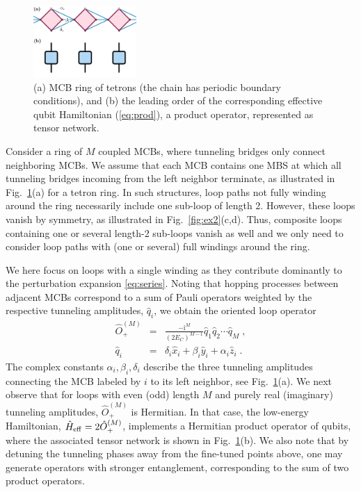 \documentclass[twocolumn,floats,prx,showpacs]{revtex4-1}
\begin{document}
\begin{figure}
\includegraphics[width=0.35\textwidth]{fig/tetron_prod.pdf}
\caption{(a) MCB ring of tetrons (the chain has periodic boundary conditions), and (b) the leading order of the corresponding effective qubit Hamiltonian (\ref{eq:prod}), a product operator, represented as tensor network.}
\label{fig:tetron_prod}
\end{figure}

Consider a ring of $M$ coupled MCBs, where tunneling bridges only connect neighboring MCBs.  We assume that each MCB contains one MBS at which all tunneling bridges incoming from the left neighbor terminate, as illustrated in Fig.~\ref{fig:tetron_prod}(a) for a tetron ring. In such structures,  loop paths not fully winding around the ring necessarily include one sub-loop of length 2. However, these loops vanish by symmetry, as illustrated in Fig.~\ref{fig:ex2}(c,d). Thus, composite loops containing one or several length-2 sub-loops vanish as well and we only need to consider loop paths with (one or several) full windings around the ring.

We here focus on loops with a single winding as they contribute dominantly to the perturbation expansion \eqref{eq:series}. Noting that hopping processes between adjacent MCBs correspond to a sum of Pauli operators weighted by the respective tunneling amplitudes, $\hat q_i$, we obtain the oriented loop operator 
\begin{eqnarray}
\hat O_+^{(M)} &=& \frac{-\mathrm i^M}{(2E_C)^{M-1}} \hat q_1 \hat q_2 \cdots \hat q_M  \label{eq:prod} \;,\\ \nonumber
\hat q_i &=& \delta_i \hat x_i + \beta_i \hat y_i + \alpha_i \hat z_i \;.
\end{eqnarray}
The complex constants $\alpha_i,\beta_i,\delta_i$ describe the three tunneling amplitudes connecting the MCB labeled by $i$ to its left neighbor, see Fig.~\ref{fig:tetron_prod}(a). We next observe that for loops with even (odd) length $M$ and purely real (imaginary) tunneling amplitudes, $\hat O^{(M)}_+$ is Hermitian.  In that case, the low-energy Hamiltonian, $\hat H_{\rm eff}=2\hat O_+^{(M)}$, implements a Hermitian product 
operator of qubits, where
the associated tensor network is shown in Fig.~\ref{fig:tetron_prod}(b).
We also note that by detuning the tunneling phases away from the fine-tuned points above, one may generate operators with stronger entanglement, corresponding to the sum of two product operators. 
\end{document}
